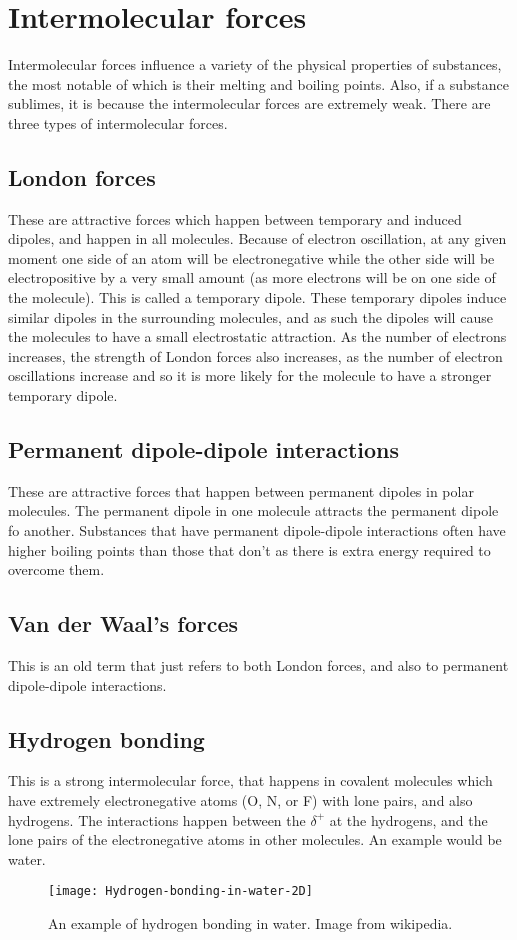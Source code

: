 \section{Intermolecular forces}
Intermolecular forces influence a variety of the physical properties of substances, the most notable of which is their melting and boiling points. Also, if a substance sublimes, it is because the intermolecular forces are extremely weak. There are three types of intermolecular forces.

\subsection{London forces}
These are attractive forces which happen between temporary and induced dipoles, and happen in all molecules. Because of electron oscillation, at any given moment one side of an atom will be electronegative while the other side will be electropositive by a very small amount (as more electrons will be on one side of the molecule). This is called a temporary dipole. These temporary dipoles induce similar dipoles in the surrounding molecules, and as such the dipoles will cause the molecules to have a small electrostatic attraction. As the number of electrons increases, the strength of London forces also increases, as the number of electron oscillations increase and so it is more likely for the molecule to have a stronger temporary dipole.

\subsection{Permanent dipole-dipole interactions}
These are attractive forces that happen between permanent dipoles in polar molecules. The permanent dipole in one molecule attracts the permanent dipole fo another. Substances that have permanent dipole-dipole interactions often have higher boiling points than those that don't as there is extra energy required to overcome them.

\subsection{Van der Waal's forces}
This is an old term that just refers to both London forces, and also to permanent dipole-dipole interactions.

\subsection{Hydrogen bonding}
This is a strong intermolecular force, that happens in covalent molecules which have extremely electronegative atoms (O, N, or F) with lone pairs, and also hydrogens. The interactions happen between the $\delta^+$ at the hydrogens, and the lone pairs of the electronegative atoms in other molecules. An example would be water.
\begin{figure}[ht]
	\texttt{[image: Hydrogen-bonding-in-water-2D]}
	\centering
	\caption{An example of hydrogen bonding in water. Image from wikipedia.}
\end{figure}
